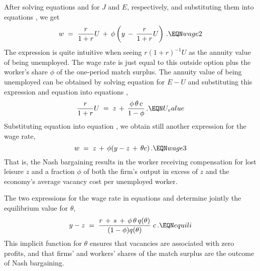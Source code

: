 After solving equations  and  for $J$ and $E$,
respectively, and substituting them into equations , we get
$$
w\;=\; {r \over 1+r} U \,+\, \phi\left(y\,-\, {r \over 1+r} U\right)\,.
                                                     \EQN wage2
$$
The expression is quite intuitive when seeing $r(1+r)^{-1}U$
as the annuity value of being unemployed. The wage rate is
just equal to this outside option plus the worker's share $\phi$ of
the one-period match surplus. The annuity value of being unemployed
can be obtained by solving equation  for $E-U$ and
substituting this expression and equation  into equations
,
$$
{r \over 1+r} U \;=\; z \,+\, {\phi\,\theta\,c \over 1-\phi}\,.  \EQN U_value
$$
Substituting equation  into equation ,
we obtain still another expression for the wage rate,
$$
w\;=\; z \,+\, \phi (y-z\,+\,\theta c)\,.              \EQN wage3
$$
That is, the Nash bargaining results in the worker receiving
compensation for lost leisure $z$ and a fraction $\phi$ of both
the firm's output in excess of $z$ and the economy's average
vacancy cost per unemployed worker.

The two expressions for the wage rate in equations  and
 determine jointly the equilibrium value for $\theta$,
$$
y-z \;=\; {r\,+\,s\,+\,\phi\,\theta\,q(\theta) \over
                    (1-\phi) q(\theta) } \; c \,.            \EQN equili
$$
This implicit function for $\theta$ ensures that
vacancies are associated with zero profits, and that firms' and
workers' shares of the match surplus are the outcome of Nash
bargaining.



